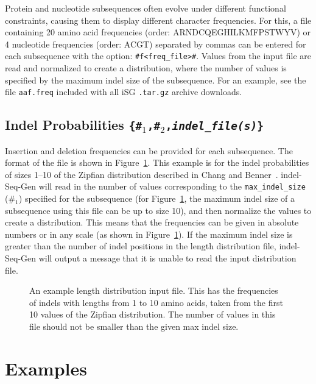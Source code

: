 \documentclass[10pt]{article}
\begin{document}
Protein and nucleotide subsequences often evolve under different functional constraints, causing them to display different character frequencies. For this, a file containing 20 amino acid frequencies (order: ARNDCQEGHILKMFPSTWYV) or 4 nucleotide frequencies (order: ACGT) separated by commas can be entered for each subsequence with the option:
\verb+#f<freq_file>#+.  Values from the input file are read and normalized to create a
distribution, where the number of values is specified by the maximum indel size of the
subsequence. For an example, see the file {\tt aaf.freq} included with all iSG {\tt .tar.gz} archive downloads.

\subsection{Indel Probabilities {\tt \{\#$_1$,\#$_2$,{\it indel\_file(s)}\}}}

Insertion and deletion frequencies can be provided for each subsequence.  The format of the file is shown in Figure~\ref{fig:zipf}.  This example is for the indel probabilities of sizes 1--10 of the Zipfian distribution described in Chang and Benner~\cite{Chang04}.
indel-Seq-Gen will read in the number of values corresponding to the {\tt max\_indel\_size} (\#$_1$) specified for the subsequence (for Figure~\ref{fig:zipf}, the maximum indel size of a subsequence using this file can be up to size 10), and then normalize the values to create a distribution.  This means that the frequencies can be given in absolute numbers or in any scale (as shown in Figure~\ref{fig:zipf}).  If the maximum indel size is greater than the number of indel positions in the length distribution file, indel-Seq-Gen will output a message that it is unable to read the input distribution file.

\begin{figure}[htbp]
\centering
{}
\caption{An example length distribution input file.  This has the frequencies of indels with lengths from 1 to 10 amino acids, taken from the first 10 values of the Zipfian
distribution.  The number of values in this file should not be smaller than the given max
indel size.}
\label{fig:zipf}
\end{figure}

\section{Examples}
\label{sec:example}
\end{document}
